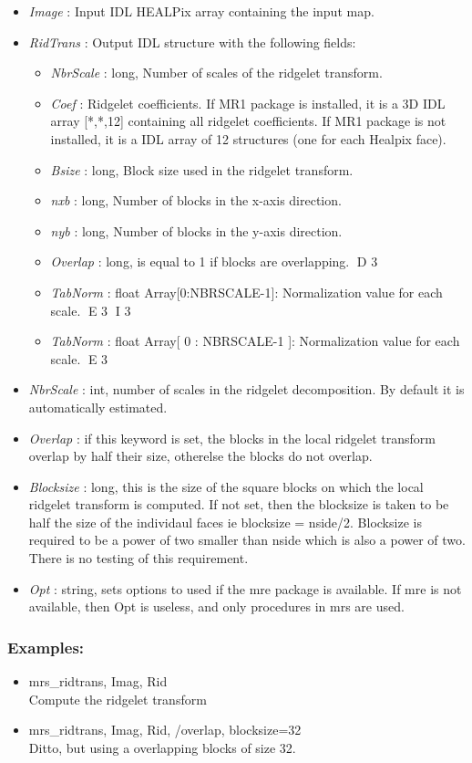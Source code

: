 \begin{itemize}
\item {\em Image} : Input IDL HEALPix array containing the input map.
\item {\em RidTrans} : Output IDL structure with the following fields: 
\begin{itemize} 
\item {\em NbrScale} : long, Number of scales of the ridgelet transform.
\item {\em Coef} : Ridgelet coefficients. If MR1 package is installed, it is a 3D IDL array [*,*,12] containing all ridgelet coefficients. 
If MR1 package is not installed, it is a IDL array of 12 structures (one for each Healpix face).
\item {\em Bsize} : long, Block size used in the ridgelet transform.
\item {\em nxb} : long, Number of blocks in the x-axis direction.
\item {\em nyb} : long, Number of blocks in the y-axis direction.
\item {\em Overlap} : long, is equal to 1 if blocks are overlapping.
D 3
\item {\em TabNorm} : float Array[0:NBRSCALE-1]: Normalization value for each scale.
E 3
I 3
\item {\em TabNorm} : float Array[ 0 : NBRSCALE-1 ]: Normalization value for each scale.
E 3
\end{itemize}
\item {\em NbrScale} : int, number of scales in the ridgelet decomposition. By default it is automatically estimated.
\item {\em Overlap} : if this keyword is set, the blocks in the local ridgelet transform overlap by half their size, otherelse the blocks do not overlap.
\item {\em Blocksize} : long, this is the size of the square blocks on which the local ridgelet transform is computed. 
If not set, then the blocksize is taken to be half the size of the individaul faces ie blocksize = nside/2. Blocksize is 
required to be a power of two smaller than nside which is also a power of two. There is no testing of this requirement.
\item {\em Opt} : string, sets options to used if the mre package is available. If mre is not available, 
then Opt is useless, and only procedures in mrs are used.
\end{itemize}

\subsubsection*{Examples:} 
\begin{itemize}
\item mrs\_ridtrans, Imag, Rid   \\
Compute the ridgelet transform
\item mrs\_ridtrans, Imag, Rid, /overlap, blocksize=32 \\
Ditto, but using a overlapping blocks of size 32.
\end{itemize}




